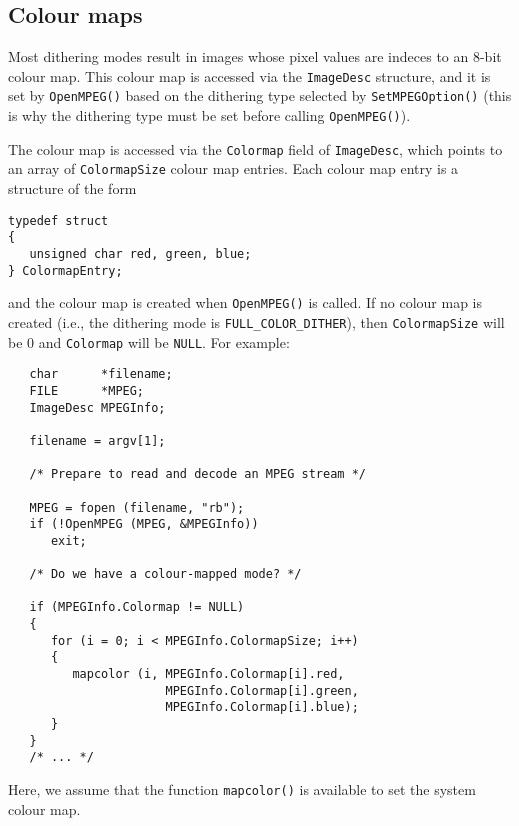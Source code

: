 \documentclass[11pt]{article}
\newcommand{\code}[1]{\texttt{#1}}
\begin{document}
\subsection{Colour maps}
\label{sec:colour_maps}

Most dithering modes result in images whose pixel values are indeces to an
8-bit colour map.  This colour map is accessed via the \code{ImageDesc}
structure, and it is set by \code{OpenMPEG()} based on the dithering type
selected by \code{SetMPEGOption()} (this is why the dithering type must be
set before calling \code{OpenMPEG()}).

The colour map is accessed via the \code{Colormap} field of
\code{ImageDesc}, which points to an array of \code{ColormapSize}
colour map entries.  Each colour map entry is a structure of the form
\begin{verbatim}
typedef struct
{
   unsigned char red, green, blue;
} ColormapEntry;
\end{verbatim}
and the colour map is created when \code{OpenMPEG()} is called.  If no
colour map is created (i.e., the dithering mode is
\code{FULL\_COLOR\_DITHER}), then \code{ColormapSize} will be 0 and
\code{Colormap} will be \code{NULL}.  For example:
\begin{verbatim}
   char      *filename;
   FILE      *MPEG;
   ImageDesc MPEGInfo;

   filename = argv[1];

   /* Prepare to read and decode an MPEG stream */

   MPEG = fopen (filename, "rb");
   if (!OpenMPEG (MPEG, &MPEGInfo))
      exit;

   /* Do we have a colour-mapped mode? */

   if (MPEGInfo.Colormap != NULL)
   {
      for (i = 0; i < MPEGInfo.ColormapSize; i++)
      {
         mapcolor (i, MPEGInfo.Colormap[i].red,
                      MPEGInfo.Colormap[i].green,
                      MPEGInfo.Colormap[i].blue);
      }
   }
   /* ... */
\end{verbatim}
Here, we assume that the function \code{mapcolor()} is available to
set the system colour map.

\end{document}

